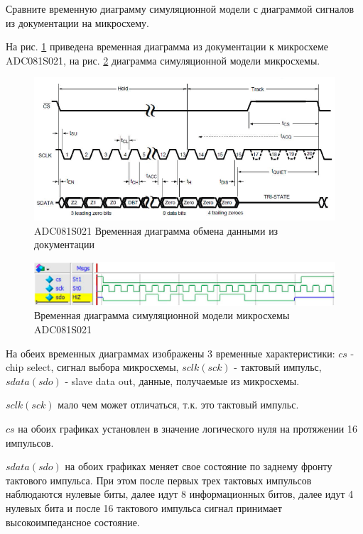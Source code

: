 \documentclass[a4paper,14pt]{article}
\begin{document}
	Сравните временную диаграмму симуляционной модели с	диаграммой сигналов из документации на микросхему. 		
	
	На рис. \ref{fig:9.7} приведена временная диаграмма из документации к микросхеме ADC081S021, на рис. \ref{fig:9.11} диаграмма симуляционной модели микросхемы.
	
	\begin{figure}[H]
		\centering
		\includegraphics[width=0.9\linewidth]{images/9_7}
		\caption{ADC081S021 Временная диаграмма обмена данными из документации}
		\label{fig:9.7}
	\end{figure}
	
	
	\begin{figure}[H]
		\centering
		\includegraphics[width=0.9\linewidth]{images/9_11}
		\caption{Временная диаграмма симуляционной модели микросхемы ADC081S021}
		\label{fig:9.11}
	\end{figure}

	На обеих временных диаграммах изображены 3 временные характеристики: $cs$ - chip select, сигнал выбора микросхемы, $sclk(sck)$ - тактовый импульс, $sdata(sdo)$ - slave data out, данные, получаемые из микросхемы.
	
	$sclk(sck)$ мало чем может отличаться, т.к. это тактовый импульс.
	
	$cs$ на обоих графиках установлен в значение логического нуля на протяжении 16 импульсов.
	
	$sdata(sdo)$ на обоих графиках меняет свое состояние по заднему фронту тактового импульса. При этом после первых трех тактовых импульсов наблюдаются нулевые биты, далее идут 8 информационных битов, далее идут 4 нулевых бита и после 16 тактового импульса сигнал принимает высокоимпедансное состояние.
	
\end{document}
